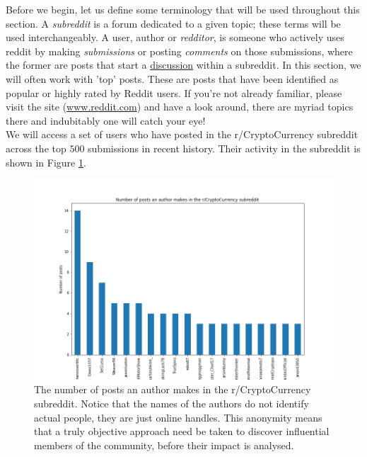 \documentclass[twoside]{report}
\begin{document}
\begin{spacing}{1}
Before we begin, let us define some terminology that will be used throughout this section. A \textit{subreddit} is a forum dedicated to a given topic; these terms will be used interchangeably. A user, author or \textit{redditor}, is someone who actively uses reddit by making \textit{submissions} or posting \textit{comments} on those submissions, where the former are posts that start a \underline{discussion} within a subreddit. In this section, we will often work with 'top' posts. These are posts that have been identified as popular or highly rated by Reddit users. If you're not already familiar, please visit the site (\url{www.reddit.com}) and have a look around, there are myriad topics there and indubitably one will catch your eye!\\ 

We will access a set of users who have posted in the r/CryptoCurrency subreddit across the top $500$ submissions in recent history. Their activity in the subreddit is shown in Figure \ref{fig:num_posts_r_crypto}. 

\begin{figure}
    \centering
    \includegraphics[width=0.8\linewidth]{Reddit_Analysis/Network_Analysis/num_posts_r_crypto.png}
    \caption{The number of posts an author makes in the r/CryptoCurrency subreddit. Notice that the names of the authors do not identify actual people, they are just online handles. This anonymity means that a truly objective approach need be taken to discover influential members of the community, before their impact is analysed.}
    \label{fig:num_posts_r_crypto}
\end{figure}


\end{spacing}
\end{document}
